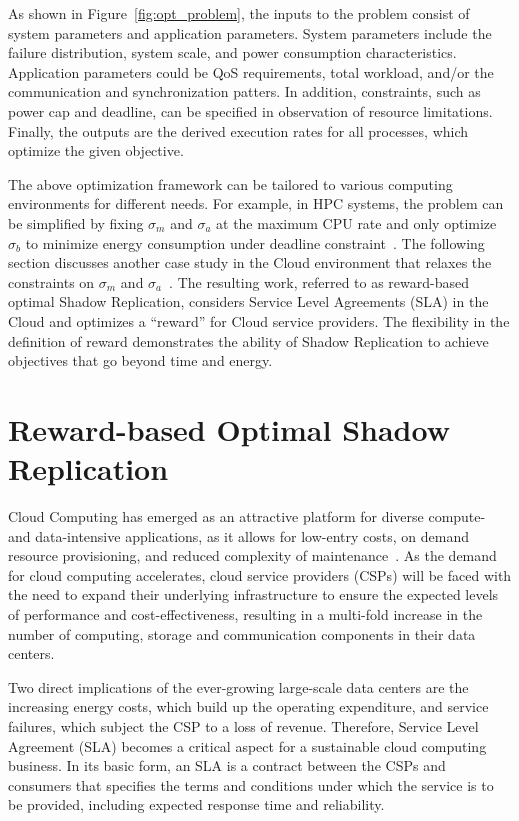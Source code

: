 As shown in Figure~\ref{fig:opt_problem}, the inputs to the problem consist of system parameters and application parameters. System parameters include the failure distribution, system scale, and power consumption characteristics. Application parameters could be QoS requirements, total workload, and/or the communication and synchronization patters. In addition, constraints, such as power cap and deadline, can be specified in observation of resource limitations. Finally, the outputs are the derived execution rates for all processes, which optimize the given objective.

The above optimization framework can be tailored to various computing environments for different needs. For example, in HPC systems, the problem can be simplified by fixing $\sigma_m$ and $\sigma_a$ at the maximum CPU rate and only optimize $\sigma_b$ to minimize energy consumption under deadline constraint~\cite{mills_2014_icnc}. The following section discusses another case study in the Cloud environment that relaxes the constraints on $\sigma_m$ and $\sigma_a$~\cite{cui_2014_closer}. The resulting work, referred to as reward-based optimal Shadow Replication, considers Service Level Agreements (SLA) in the Cloud and optimizes a ``reward'' for Cloud service providers. The flexibility in the definition of reward demonstrates the ability of Shadow Replication to achieve objectives that go beyond time and energy. 



\section{Reward-based Optimal Shadow Replication}
Cloud Computing has emerged as an attractive platform for 
diverse compute- and data-intensive applications, as it allows for
low-entry costs, on demand resource provisioning, and
reduced complexity of maintenance~\cite{tchana_cits_2012}. 
As the demand for cloud computing
accelerates, cloud service providers (CSPs) will be faced with the
need to expand their underlying infrastructure to ensure the expected
levels of performance and cost-effectiveness, resulting
in a multi-fold increase in the number of computing, storage and communication components in their data centers.

Two direct implications of the ever-growing large-scale data centers are the increasing energy costs, which build up the operating expenditure, and service failures, which subject the CSP to a loss of revenue. Therefore, Service Level Agreement (SLA) becomes a critical aspect for a sustainable cloud computing business. 
In its basic form, an SLA is a contract between the CSPs and consumers that specifies the terms and conditions under which the service is to be provided, including expected response time and reliability.


